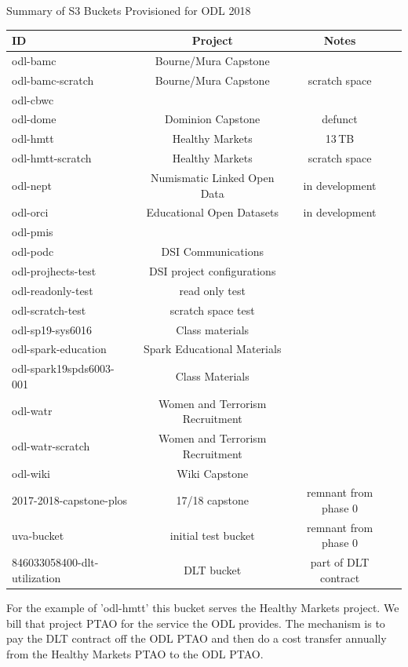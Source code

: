 \begin{center}
Summary of S3 Buckets Provisioned for ODL 2018
\begin{tabular}{lccr}
\hline
\hline
ID & Project & Notes \\
\hline
\hline
odl-bamc & Bourne/Mura Capstone & \\
odl-bamc-scratch & Bourne/Mura Capstone & scratch space \\
odl-cbwc & & \\
odl-dome & Dominion Capstone & defunct \\
odl-hmtt & Healthy Markets & 13\,TB \\
odl-hmtt-scratch & Healthy Markets & scratch space \\
odl-nept & Numismatic Linked Open Data & in development \\
odl-orci & Educational Open Datasets & in development \\
odl-pmis & & \\
odl-podc & DSI Communications & \\
odl-projhects-test & DSI project configurations & \\
odl-readonly-test & read only test & \\
odl-scratch-test & scratch space test & \\
odl-sp19-sys6016 & Class materials & \\
odl-spark-education & Spark Educational Materials & \\
odl-spark19spds6003-001 & Class Materials & \\
odl-watr & Women and Terrorism Recruitment & \\
odl-watr-scratch & Women and Terrorism Recruitment & \\
odl-wiki & Wiki Capstone & \\
\hline
2017-2018-capstone-plos & 17/18 capstone & remnant from phase 0 \\
uva-bucket & initial test bucket & remnant from phase 0 \\
846033058400-dlt-utilization & DLT bucket & part of DLT contract \\
\hline
\hline
\end{tabular}
\end{center}

For the example of 'odl-hmtt' this bucket serves the Healthy Markets project. We bill that project PTAO for the service the ODL provides. The mechanism is to pay the DLT contract off the ODL PTAO and then do a cost transfer annually from the Healthy Markets PTAO to the ODL PTAO.

